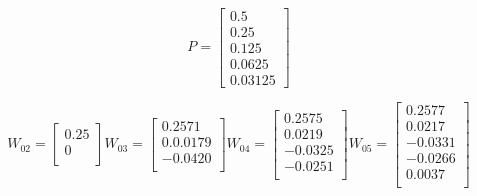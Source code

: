 \documentclass[12pt]{article}
\newenvironment{problem}[2][Problem]{\begin{trivlist}
\item[\hskip \labelsep {\bfseries #1}\hskip \labelsep {\bfseries #2.}]}{\end{trivlist}}
\begin{document}
\begin{problem}{2}
\text{ }\\
\[
P=
  \begin{bmatrix}
    0.5 \\
    0.25 \\
    0.125\\
    0.0625\\
    0.03125
  \end{bmatrix}
\]
\end{problem}
\[
W_02=
    \begin{bmatrix}
    0.25\\
    0\\
    \end{bmatrix}%
%
W_03=
    \begin{bmatrix}
    0.2571\\
    0.0.0179\\
    -0.0420\\
    \end{bmatrix}
W_04=
    \begin{bmatrix}
    0.2575\\
    0.0219\\
    -0.0325\\
    -0.0251\\
    \end{bmatrix}
W_05=
    \begin{bmatrix}
    0.2577\\
    0.0217\\
    -0.0331\\
    -0.0266\\
    0.0037\\
    \end{bmatrix}
\]
\end{document}
